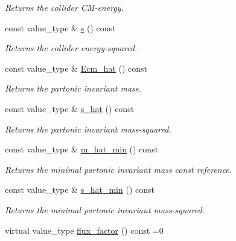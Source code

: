 \begin{DoxyCompactItemize}
\begin{DoxyCompactList}\small\item\em Returns the collider C\-M-\/energy. \end{DoxyCompactList}\item 
\hypertarget{a00304_ae2984255cbdaabc293b8168d93c767bf}{const value\-\_\-type \& \hyperlink{a00304_ae2984255cbdaabc293b8168d93c767bf}{s} () const }\label{a00304_ae2984255cbdaabc293b8168d93c767bf}

\begin{DoxyCompactList}\small\item\em Returns the collider energy-\/squared. \end{DoxyCompactList}\item 
\hypertarget{a00304_af47155e6e1a988a08ac05fcf505c9aeb}{const value\-\_\-type \& \hyperlink{a00304_af47155e6e1a988a08ac05fcf505c9aeb}{Ecm\-\_\-hat} () const }\label{a00304_af47155e6e1a988a08ac05fcf505c9aeb}

\begin{DoxyCompactList}\small\item\em Returns the partonic invariant mass. \end{DoxyCompactList}\item 
\hypertarget{a00304_ab657762807a24b906892e6126540113b}{const value\-\_\-type \& \hyperlink{a00304_ab657762807a24b906892e6126540113b}{s\-\_\-hat} () const }\label{a00304_ab657762807a24b906892e6126540113b}

\begin{DoxyCompactList}\small\item\em Returns the partonic invariant mass-\/squared. \end{DoxyCompactList}\item 
\hypertarget{a00304_afecc06cfef167158a1e66a1692b7abc3}{const value\-\_\-type \& \hyperlink{a00304_afecc06cfef167158a1e66a1692b7abc3}{m\-\_\-hat\-\_\-min} () const }\label{a00304_afecc06cfef167158a1e66a1692b7abc3}

\begin{DoxyCompactList}\small\item\em Returns the minimal partonic invariant mass const reference. \end{DoxyCompactList}\item 
\hypertarget{a00304_a04d3384f909d541d7aea905622f8a4ec}{const value\-\_\-type \& \hyperlink{a00304_a04d3384f909d541d7aea905622f8a4ec}{s\-\_\-hat\-\_\-min} () const }\label{a00304_a04d3384f909d541d7aea905622f8a4ec}

\begin{DoxyCompactList}\small\item\em Returns the minimal partonic invariant mass-\/squared. \end{DoxyCompactList}\item 
\hypertarget{a00304_a90c718ed5a88168638ea93be51b2d44a}{virtual value\-\_\-type \hyperlink{a00304_a90c718ed5a88168638ea93be51b2d44a}{flux\-\_\-factor} () const =0}\label{a00304_a90c718ed5a88168638ea93be51b2d44a}


\end{DoxyCompactItemize}
